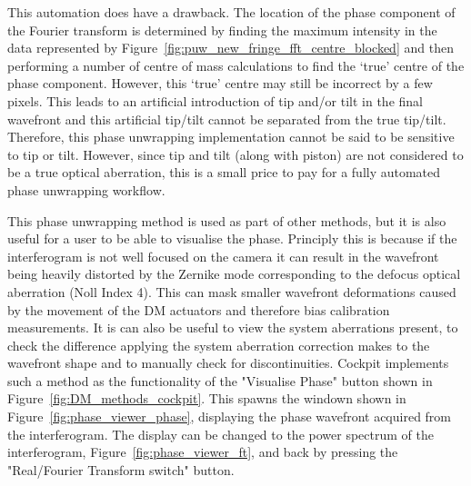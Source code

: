 This automation does have a drawback. The location of the phase component of the Fourier transform is determined by finding the maximum intensity in the data represented by Figure~\ref{fig:puw_new_fringe_fft_centre_blocked} and then performing a number of centre of mass calculations to find the `true' centre of the phase component. However, this `true' centre may still be incorrect by a few pixels. This leads to an artificial introduction of tip and/or tilt in the final wavefront and this artificial tip/tilt cannot be separated from the true tip/tilt. Therefore, this phase unwrapping implementation cannot be said to be sensitive to tip or tilt. However, since tip and tilt (along with piston) are not considered to be a true optical aberration, this is a small price to pay for a fully automated phase unwrapping workflow.

This phase unwrapping method is used as part of other methods, but it is also useful for a user to be able to visualise the phase. Principly this is because if the interferogram is not well focused on the camera it can result in the wavefront being heavily distorted by the Zernike mode corresponding to the defocus optical aberration (Noll Index 4). This can mask smaller wavefront deformations caused by the movement of the DM actuators and therefore bias calibration measurements. It is can also be useful to view the system aberrations present, to check the difference applying the system aberration correction makes to the wavefront shape and to manually check for discontinuities. Cockpit implements such a method as the functionality of the "Visualise Phase" button shown in Figure~\ref{fig:DM_methods_cockpit}. This spawns the windown shown in Figure~\ref{fig:phase_viewer_phase}, displaying the phase wavefront acquired from the interferogram. The display can be changed to the power spectrum of the interferogram, Figure~\ref{fig:phase_viewer_ft}, and back by pressing the "Real/Fourier Transform switch" button. 


